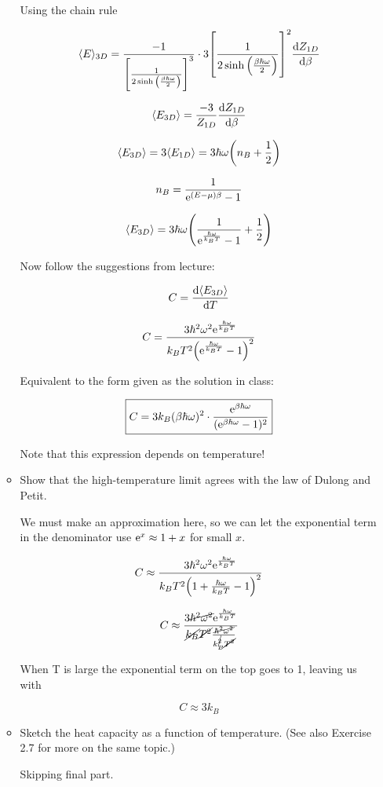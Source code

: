 \begin{enumerate}[label=(\alph*)]
\begin{itemize}
        Using the chain rule

        \[ \avg{E}_{3D} = \frac{-1}{\brackets*{\frac{1}{2 \sinh{\paren*{\frac{\beta \hbar \omega}{2}}}}}^3} \cdot 3 \brackets*{\frac{1}{2 \sinh{\paren*{\frac{\beta \hbar \omega}{2}}}}}^2 \dv{Z_{1D}}{\beta} \]

        \[ \langle E_{3D} \rangle = \frac{-3}{Z_{1D}} \dv{Z_{1D}}{\beta} \]

        \[ \avg{E_{3D}} = 3 \avg{E_{1D}} =  3\hbar \omega \paren*{ n_B + \frac{1}{2}} \]

        \[ n_B = \frac{1}{\mathrm{e}^{(E-\mu) \beta} -1}\]
        
        \[ \avg{E_{3D}} = 3 \hbar \omega \paren*{\recip{\e^{\frac{\hbar \omega}{k_B T}} -1} + \frac{1}{2}} \]

        
        Now follow the suggestions from lecture:

        \[ C = \dv{\langle E_{3D} \rangle}{T} \]

        \[ C = \frac{3 \hbar^2 \omega^2 \e^{\frac{\hbar \omega}{k_BT}}}{k_B T^2 \paren*{\e^{\frac{\hbar \omega }{k_B T}}-1}^2}\]

        Equivalent to the form given as the solution in class:
        
        \[ \boxed{ C = 3 k_B (\beta \hbar \omega)^2 \cdot \frac{\mathrm{e}^{\beta \hbar \omega}}{(\mathrm{e}^{\beta \hbar \omega} -1)^2} }\]

        Note that this expression depends on temperature! 

        
        \item Show that the high-temperature limit agrees with the law of Dulong and Petit.
        
        \divider

        We must make an approximation here, so we can let the exponential term in the denominator use $\mathrm{e}^x \approx 1 + x $ for small $x$.

        \[ C \approx  \frac{3 \hbar^2 \omega^2 \e^{\frac{\hbar \omega}{k_BT}}}{k_B T^2 \paren*{1 + \frac{\hbar \omega }{k_B T}-1}^2}\]

        \[ C \approx  \frac{3 \cancel{\hbar^2 \omega^2} \mathrm{e}^{\frac{\hbar \omega}{k_BT}}}{\cancel{k_B} \cancel{T^2} \frac{\cancel{\hbar^2 \omega^2} }{k_B^{\cancel{2}} \cancel{T^2}}}\]

        When T is large the exponential term on the top goes to 1, leaving us with 

        \[ \boxed{ C \approx 3 k_B }\]
        
        
        \item Sketch the heat capacity as a function of temperature. (See also Exercise 2.7 for more on the same topic.)
        
        \divider

        Skipping final part.
    \end{itemize}

    \end{enumerate}

